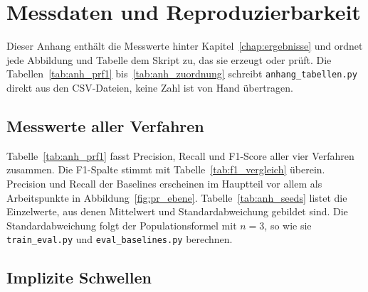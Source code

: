 \chapter{Messdaten und Reproduzierbarkeit}
\label{chap:anhang_messdaten}

Dieser Anhang enthält die Messwerte hinter Kapitel~\ref{chap:ergebnisse} und ordnet jede Abbildung und Tabelle dem Skript zu, das sie erzeugt oder prüft. Die Tabellen~\ref{tab:anh_prf1} bis~\ref{tab:anh_zuordnung} schreibt \texttt{anhang\_\allowbreak tabellen.py} direkt aus den CSV-Dateien, keine Zahl ist von Hand übertragen.

\section{Messwerte aller Verfahren}
\label{sec:anh_messwerte}

Tabelle~\ref{tab:anh_prf1} fasst Precision, Recall und F1-Score aller vier Verfahren zusammen. Die F1-Spalte stimmt mit Tabelle~\ref{tab:f1_vergleich} überein. Precision und Recall der Baselines erscheinen im Hauptteil vor allem als Arbeitspunkte in Abbildung~\ref{fig:pr_ebene}. Tabelle~\ref{tab:anh_seeds} listet die Einzelwerte, aus denen Mittelwert und Standardabweichung gebildet sind. Die Standardabweichung folgt der Populationsformel mit $n=3$, so wie sie \texttt{train\_\allowbreak eval.py} und \texttt{eval\_\allowbreak baselines.py} berechnen.

\begin{table}[htbp]
	\centering
	\small
	\renewcommand{\arraystretch}{1.15}
	\caption[Precision, Recall und F1-Score aller Verfahren je SNR-Stufe]{Precision, Recall und F1-Score aller Verfahren je SNR-Stufe, Mittelwert $\pm$ Standardabweichung über die Seeds 0, 1 und 2 mit je $20\,000$ Testflüssen.}
	\label{tab:anh_prf1}
	
\end{table}

\begin{table}[tb]
	\centering
	\small
	\setlength{\tabcolsep}{3.5pt}
	\renewcommand{\arraystretch}{1.15}
	\caption[Einzelwerte je Seed]{Precision (P), Recall (R) und F1-Score je Seed und SNR-Stufe (SNR in dB).}
	\label{tab:anh_seeds}
	
\end{table}

\section{Implizite Schwellen}
\label{sec:anh_schwellen}

